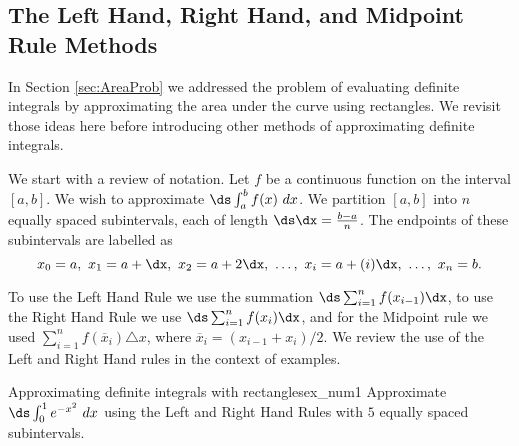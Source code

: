 \subsection*{The Left Hand, Right Hand, and Midpoint Rule Methods}

In Section \ref{sec:AreaProb} we addressed the problem of evaluating definite integrals by approximating the area under the curve using rectangles. We revisit those ideas here before introducing other methods of approximating definite integrals. 

We start with a review of notation. Let $f$ be a continuous function on the interval $[a,b]$. We wish to approximate $\ds \int_a^b f(x)\ dx$. We partition $[a,b]$ into $n$ equally spaced subintervals, each of length $\ds \dx = \frac{b-a}{n}$. The endpoints of these subintervals are labelled as $$x_0=a,\ x_1 = a+\dx,\ x_2 = a+ 2\dx,\ \ldots,\ x_i = a+(i)\dx,\ \ldots,\ x_{n} = b.$$

To use the Left Hand Rule we use the summation $\ds \sum_{i=1}^n f(x_{i-1})\dx$,  to use the Right Hand Rule we use $\ds \sum_{i=1}^n f(x_{i})\dx$, and for the Midpoint rule we used $ \sum_{i = 1}^{n} f(\overline{x}_i) \triangle x $, where  $\overline{x}_{i} = (x_{i-1} + x_i)/2$. We review the use of the Left and Right Hand rules in the context of examples.\\


\begin{example}{Approximating definite integrals with rectangles}{ex_num1}
{
Approximate $\ds \int_0^1e^{-x^2}\ dx$ using the Left and Right Hand Rules with $ 5 $ equally spaced subintervals.
}
\end{example}

